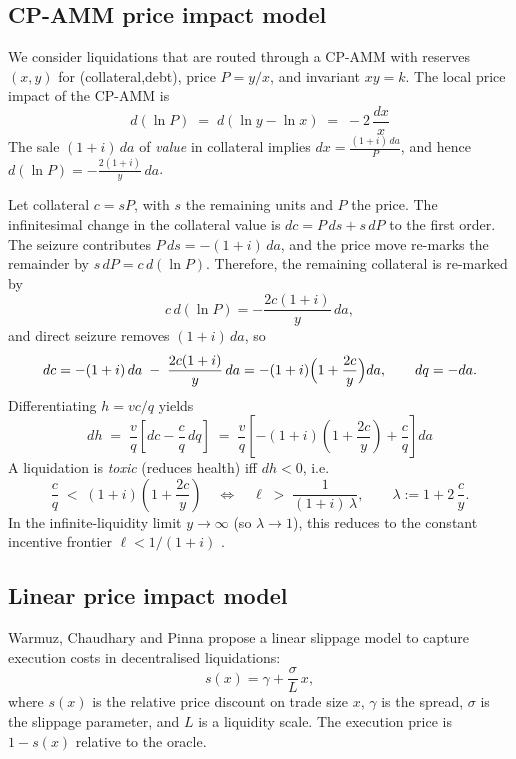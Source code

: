 \documentclass[11pt]{article}
\begin{document}
\subsection{CP-AMM price impact model}
We consider liquidations that are routed through a CP-AMM with reserves \((x,y)\) for (collateral,debt), price \(P=y/x\), and invariant \(xy=k\). The local price impact of the CP-AMM is
\begin{equation}
d(\ln P) \;=\; d(\ln y - \ln x) \;=\; -2\,\frac{dx}{x}
\label{eq:cp-impact}
\end{equation}
The sale \((1+i)\,da\) of \emph{value} in collateral implies \(dx = \frac{(1+i)\,da}{P}\), and hence \(d(\ln P) = -\frac{2(1+i)}{y}\,da\).

Let collateral $c=sP$, with $s$ the remaining units and $P$ the price. The infinitesimal change in the collateral value is $dc = P\,ds + s\,dP$ to the first order. The seizure contributes $P\,ds=-(1+i)\,da$, and the price move re-marks the remainder by $s\,dP=c\,d(\ln P)$. Therefore, the remaining collateral is re-marked by
\[
c\,d(\ln P) = -\frac{2c(1+i)}{y}\,da,
\]
and direct seizure removes \((1+i)\,da\), so
\[
dc = - (1+i)\,da \;-\; \frac{2c(1+i)}{y}\,da
= -(1+i)\Bigl(1+\frac{2c}{y}\Bigr)da,
\qquad dq=-da.
\]
Differentiating \(h = v c/q\) yields
\[
dh \;=\; \frac{v}{q}\!\left[dc - \frac{c}{q}\,dq\right]
\;=\; \frac{v}{q}\!\left[-(1+i)\!\left(1+\frac{2c}{y}\right) + \frac{c}{q}\right]\!da
\]
A liquidation is \emph{toxic} (reduces health) iff \(dh<0\), i.e.
\begin{equation}
\frac{c}{q} \;\lt\; (1+i)\!\left(1+\frac{2c}{y}\right)
\quad\Longleftrightarrow\quad
\ell \;\gt\; \frac{1}{(1+i)\,\lambda},
\qquad
\lambda := 1 + 2\,\frac{c}{y}.
\label{eq:constant-bonus}
\end{equation}
In the infinite-liquidity limit \(y\to\infty\) (so \(\lambda\to 1\)), this reduces to the constant incentive frontier \(\ell < 1/(1+i)\) \cite{WCP2022}.

\subsection{Linear price impact model}
Warmuz, Chaudhary and Pinna \cite{WCP2022} propose a linear slippage model to capture execution costs in decentralised liquidations:
\[
s(x) = \gamma + \frac{\sigma}{L}\,x,
\]
where $s(x)$ is the relative price discount on trade size $x$, $\gamma$ is the spread, $\sigma$ is the slippage parameter, and $L$ is a liquidity scale. The execution price is $1-s(x)$ relative to the oracle.
\end{document}
